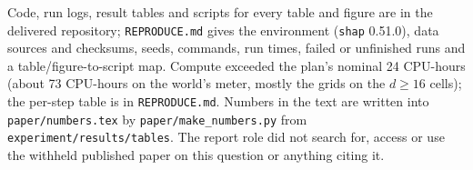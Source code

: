 Code, run logs, result tables and scripts for every table and figure are in the delivered repository; \texttt{REPRODUCE.md} gives the environment (\texttt{shap} 0.51.0), data sources and checksums, seeds, commands, run times, failed or unfinished runs and a table/figure-to-script map. Compute exceeded the plan's nominal 24 CPU-hours (about 73 CPU-hours on the world's meter, mostly the grids on the $d\ge16$ cells); the per-step table is in \texttt{REPRODUCE.md}. Numbers in the text are written into \texttt{paper/numbers.tex} by \texttt{paper/make\_numbers.py} from \texttt{experiment/results/tables}. The report role did not search for, access or use the withheld published paper on this question or anything citing it.
